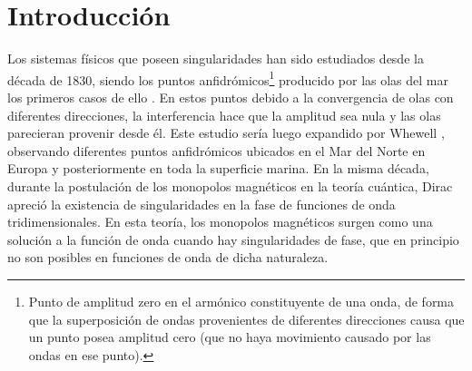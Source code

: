 \section{Introducción}
\label{sec:hist_vor}

Los sistemas físicos que poseen singularidades han sido estudiados desde la década de 1830, siendo los puntos anfidrómicos\footnote{Punto de amplitud zero en el armónico constituyente de una onda, de forma que la superposición de ondas provenientes de diferentes direcciones causa que un punto posea amplitud cero (que no haya movimiento causado por las ondas en ese punto).} producido por las olas del mar los primeros casos de ello \cite{Berry2000}. En estos puntos debido a la convergencia de olas con diferentes direcciones, la interferencia hace que la amplitud sea nula y las olas parecieran provenir desde él. Este estudio sería luego expandido por Whewell \cite{Whewell1830}, observando diferentes puntos anfidrómicos ubicados en el Mar del Norte en Europa y posteriormente en toda la superficie marina. En la misma década, durante la postulación de los monopolos magnéticos en la teoría cuántica, Dirac \cite{Dirac1931} apreció la existencia de singularidades en la fase de funciones de onda tridimensionales. En esta teoría, los monopolos magnéticos surgen como una solución a la función de onda cuando hay singularidades de fase, que en principio no son posibles en funciones de onda de dicha naturaleza.\\


